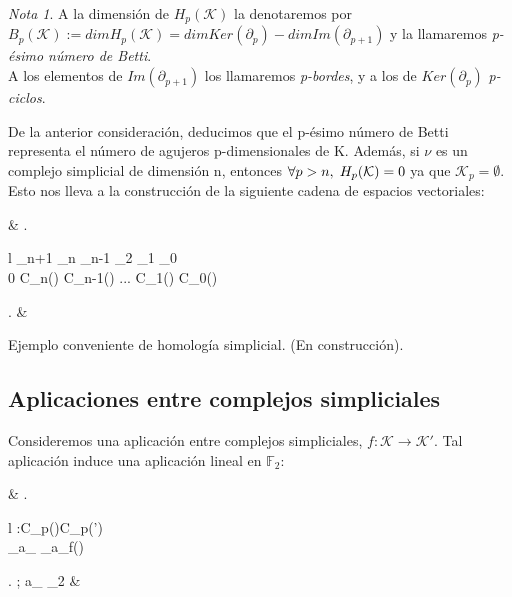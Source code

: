 \documentclass[12pt]{article}
\numberwithin{equation}{section}
\theoremstyle{definition}
\newenvironment{ejem}
  {\pushQED{\qed}\renewcommand{\qedsymbol}{$\blacktriangleleft$}\ejemplo}
  {\popQED\endejemplo}
\theoremstyle{remark}
\newtheorem*{remark}{Nota}
\theoremstyle{plain}
\begin{document}
		\begin{remark}
			A la dimensión de $H_{p}(\mathcal{K})$ la denotaremos por $B_{p}(\mathcal{K}):=dim H_{p}(\mathcal{K})=dim Ker(\partial_{p})-dim Im(\partial_{p+1})$ y la llamaremos
			\textit{p-ésimo número de Betti}.\\
			A los elementos de $Im(\partial_{p+1})$ los llamaremos \textit{p-bordes}, y a los de $Ker(\partial_{p})$ \textit{p-ciclos}.
		\end{remark}

		De la anterior consideración, deducimos que el p-ésimo número de Betti representa el número de agujeros p-dimensionales de K. Además, si {\Large $\nu$} es un complejo simplicial
		de dimensión n, entonces $\forall p > n,\hspace{0.1cm} H_{p}(\mathcal{K})=0$ ya que $\mathcal{K}_{p}=\emptyset$. Esto nos lleva a la construcción de la siguiente cadena de 
		espacios vectoriales:
		\begin{flalign*}
			& \left.
			\begin{array}{l}
				\hspace{0.1cm} \partial_{n+1} \hspace{1.1cm} \partial_{n} \hspace{1.4cm} \partial_{n-1} \hspace{0.9cm} \partial_{2} \hspace{1.3cm} \partial_{1} \hspace{1.2cm} \partial_{0}\\
				0 \rightarrow C_{n}() \rightarrow C_{n-1}() \rightarrow \hspace{0.25cm} ... \hspace{0.25cm} \rightarrow C_{1}() \rightarrow C_{0}() 
			\end{array}
			\right. &
		\end{flalign*}

		\begin{ejem}
			Ejemplo conveniente de homología simplicial. (En construcción).
		\end{ejem}	

	\subsection{Aplicaciones entre complejos simpliciales}

		Consideremos una aplicación entre complejos simpliciales, $f:\mathcal{K}\rightarrow\mathcal{K}'$. Tal aplicación induce una aplicación lineal en $\mathbb{F}_{2}$:
		\begin{flalign*}
			& \left.
			\begin{array}{l}
				:C_{p}()\rightarrow C_{p}(\mathcal{K}')\\[2pt] 
				\hspace{0.45cm} \displaystyle \sum_{}a_{\sigma}\sigma \mapsto 
				\displaystyle \sum_{}a_{\sigma}f(\sigma)
			\end{array}
			\right. ; \hspace{0.25cm} a_{\sigma} \in \mathbb{F}_{2} &
		\end{flalign*}
		
\end{document}
